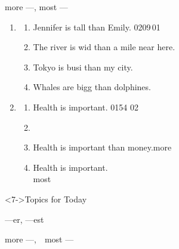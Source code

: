 \documentclass[aspectratio=169,xcolor={dvipsnames,table}]{beamer}
\begin{document}
\begin{frame}[plain]{more ---, most ---}
\begin{enumerate}
 \item<1-> \begin{enumerate}
	\item<1-> Jennifer is tall than Emily.%
\hfill{\tiny 0209}{\scriptsize {}\,01}
	\item<1-> The river is wid than a mile near here.
	\item<1-> Tokyo is busi than my city.
	\item<1-> Whales are bigg than dolphines.
       \end{enumerate}
 \item<2-> \begin{enumerate}
	\item<2-> Health is important.%
\hfill{\tiny 0154}\,{\scriptsize {}\,02}
	\item<3-> \hfill{}
	\item<5-> Health is  important than money.\hfill{\scriptsize more }
	\item<6-> Health is  important.\hfill{}\\
\hfill{\scriptsize most }
       \end{enumerate}
\end{enumerate}

\begin{block}<7->{Topics for Today}
\begin{description}[第2のパターン]\small
 \item<7->[\textcolor{black}{原則:}] ---er, ---est%
	    \hfill{}
 \item<8->[\textcolor{black}{第2のパターン:}]  more ---,\,\,\,\,\,\,most ---
	    \hfill{}\\
	    \mbox{}\hspace{120pt}\visible<9->{\Circled[fill color = white]{\small \,\,比較的長い単語は第2のパターン\,\,}}
 \end{description}
     \end{block}

\end{frame}
\end{document}
